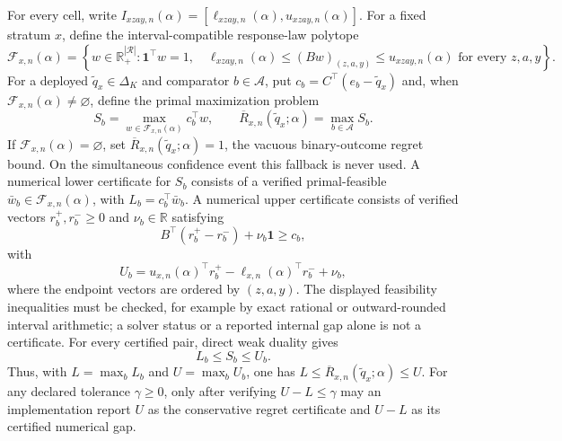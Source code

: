 For every cell, write
\(I_{xzay,n}(\alpha)=[\ell_{xzay,n}(\alpha),u_{xzay,n}(\alpha)]\).  For a
fixed stratum \(x\), define the interval-compatible response-law polytope
\[
 \mathcal F_{x,n}(\alpha)
 =\left\{w\in\mathbb R_+^{|\mathcal R|}:
 \mathbf 1^\top w=1,\quad
 \ell_{xzay,n}(\alpha)\leq(Bw)_{(z,a,y)}
 \leq u_{xzay,n}(\alpha)
 \text{ for every }z,a,y\right\}.
\]
For a deployed \(\widetilde q_x\in\Delta_K\) and comparator
\(b\in\mathcal A\), put
\(c_b=C^\top(e_b-\widetilde q_x)\) and, when
\(\mathcal F_{x,n}(\alpha)\neq\varnothing\), define the primal maximization
problem
\[
 S_b=\max_{w\in\mathcal F_{x,n}(\alpha)}c_b^\top w,
 \qquad
 \overline R_{x,n}(\widetilde q_x;\alpha)=\max_{b\in\mathcal A}S_b.
\]
If \(\mathcal F_{x,n}(\alpha)=\varnothing\), set
\(\overline R_{x,n}(\widetilde q_x;\alpha)=1\), the vacuous binary-outcome
regret bound.  On the simultaneous confidence event this fallback is never
used.  A numerical lower certificate for \(S_b\) consists of a verified
primal-feasible \(\bar w_b\in\mathcal F_{x,n}(\alpha)\), with
\(L_b=c_b^\top\bar w_b\).  A numerical upper certificate consists of
verified vectors \(r_b^+,r_b^-\geq0\) and \(\nu_b\in\mathbb R\) satisfying
\[
 B^\top(r_b^+-r_b^-)+\nu_b\mathbf 1\geq c_b,
\]
with
\[
 U_b=u_{x,n}(\alpha)^\top r_b^+
       -\ell_{x,n}(\alpha)^\top r_b^-+\nu_b,
\]
where the endpoint vectors are ordered by \((z,a,y)\).  The displayed
feasibility inequalities must be checked, for example by exact rational or
outward-rounded interval arithmetic; a solver status or a reported internal
gap alone is not a certificate.  For every certified pair, direct weak
duality gives
\[
 L_b\leq S_b\leq U_b.
\]
Thus, with \(L=\max_bL_b\) and \(U=\max_bU_b\), one has
\(L\leq\overline R_{x,n}(\widetilde q_x;\alpha)\leq U\).  For any declared
tolerance \(\gamma\geq0\), only after verifying \(U-L\leq\gamma\) may an
implementation report \(U\) as the conservative regret certificate and
\(U-L\) as its certified numerical gap.
